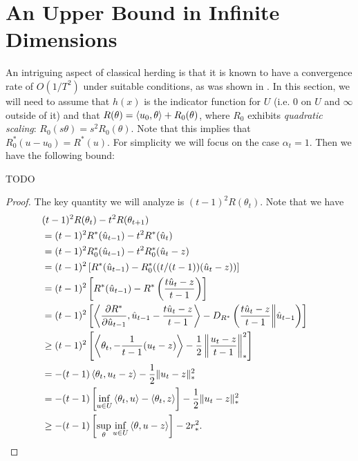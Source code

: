 \documentclass[paper.tex]{subfiles}
\begin{document}
\section{An Upper Bound in Infinite Dimensions}
\label{sec:chen-proofs}

An intriguing aspect of classical herding is that it is known to have a convergence rate of 
$O(1/T^2)$ under suitable conditions, as was shown in \citet{Chen:2010b}. In this section, 
we will need to assume that $h(x)$ is the indicator function for $U$ (i.e. $0$ on $U$ and 
$\infty$ outside of it) and that $R(\theta) = \left\langle u_0, \theta \right\rangle + R_0(\theta)$, where 
$R_0$ exhibits \emph{quadratic scaling}: $R_0(s\theta) = s^2R_0(\theta)$. Note that 
this implies that $R_0^*(u-u_0) = R^*(u)$.
For simplicity 
we will focus on the case $\alpha_t = 1$. Then we have 
the following bound:
\begin{theorem}
TODO
\end{theorem}
\begin{proof}
The key quantity we will analyze is $(t-1)^2R(\theta_t)$. Note that we have
\begin{align*}
\lefteqn{(t-1)^2R(\theta_t) - t^2R(\theta_{t+1})} \\
 &= (t-1)^2R^*(\hat{u}_{t-1})-t^2R^*(\hat{u}_t) \\
 &= (t-1)^2R_0^*(\hat{u}_{t-1})-t^2R_0^*(\hat{u}_t-z) \\
 &= (t-1)^2\left[R^*(\hat{u}_{t-1})-R_0^*((t/(t-1))(\hat{u}_t-z))\right] \\
 &= (t-1)^2\left[R^*(\hat{u}_{t-1})-R^*\left(\frac{t\hat{u}_t-z}{t-1}\right)\right] \\
 &= (t-1)^2\left[\ip{\frac{\partial R^*}{\partial \hat{u}_{t-1}}}{\hat{u}_{t-1}-\frac{t\hat{u}_t-z}{t-1}}-D_{R^*}\left(\frac{t\hat{u}_t-z}{t-1} \middle\| \hat{u}_{t-1}\right)\right] \\
 &\geq (t-1)^2\left[\ip{\theta_t}{-\frac{1}{t-1}(u_t-z)}-\frac{1}{2}\left\|\frac{u_t-z}{t-1}\right\|_*^2\right] \\
 &= -(t-1)\ip{\theta_t}{u_t-z}-\frac{1}{2}\|u_t-z\|_*^2 \\
 &= -(t-1)\left[\inf_{u \in U} \ip{\theta_t}{u} - \ip{\theta_t}{z}\right]-\frac{1}{2}\|u_t-z\|_*^2 \\
 &\geq -(t-1)\left[\sup_{\theta} \inf_{u \in U} \ip{\theta}{u-z}\right]-2r_*^2.
\end{align*}

\end{proof}
\end{document}
